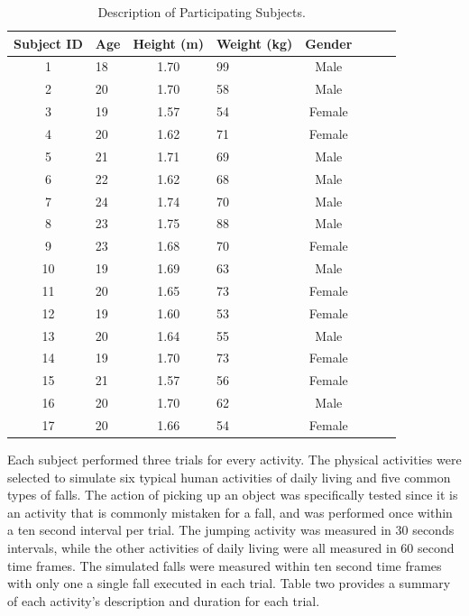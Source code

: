 \documentclass{llncs}
\begin{document}
\begin{table}
	\begin{center}
		\caption{Description of Participating Subjects.}\label{table1}
		\begin{tabular}{clclclc|c}
			\toprule
			Subject ID & Age & Height (m) & Weight (kg) & Gender\\
			\midrule
			1 &  18 & 1.70 & 99 & Male\\
			2 &  20 & 1.70 & 58 & Male\\
			3 & 19 & 1.57 & 54 & Female\\
			4 & 20 & 1.62 & 71 & Female\\
			5 & 21 & 1.71 & 69 & Male\\
			6 & 22 & 1.62 & 68 & Male\\
			7 & 24 & 1.74 & 70 & Male\\
			8 & 23 & 1.75 & 88 & Male\\
			9 & 23 & 1.68 & 70 & Female\\
			10 & 19 & 1.69 & 63 & Male\\
			11 & 20 & 1.65 & 73 & Female\\
			12 & 19 & 1.60 & 53 & Female\\
			13 & 20 & 1.64 & 55 & Male\\
			14 & 19 & 1.70 & 73 & Female\\
			15 & 21 & 1.57 & 56 & Female\\
			16 & 20 & 1.70 & 62 & Male\\
			17 & 20 & 1.66 & 54 & Female\\
			\bottomrule
		\end{tabular}
	\end{center}
\end{table}

	Each subject performed three trials for every activity. The physical activities were selected to simulate six typical human activities of daily living and five common types of falls. The action of picking up an object was specifically tested since it is an activity that is commonly mistaken for a fall, and was performed once within a ten second interval per trial. The jumping activity was measured in 30 seconds intervals, while the other activities of daily living were all measured in 60 second time frames. The simulated falls were measured within ten second time frames with only one a single fall executed in each trial. Table two provides a summary of each activity's description and duration for each trial.
	
\end{document}
